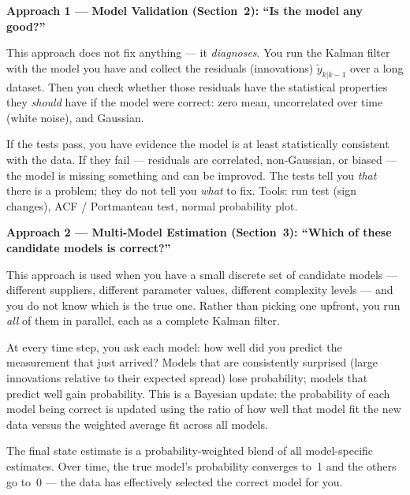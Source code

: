 \documentclass[12pt, a4paper]{article}
\begin{document}
\begin{keybox}
  \textbf{Approach 1 --- Model Validation (Section~2):
  ``Is the model any good?''}

  This approach does not fix anything --- it \emph{diagnoses}.
  You run the Kalman filter with the model you have and collect the
  residuals (innovations) $\tilde{y}_{k|k-1}$ over a long dataset.
  Then you check whether those residuals have the statistical properties
  they \emph{should} have if the model were correct: zero mean,
  uncorrelated over time (white noise), and Gaussian.

  If the tests pass, you have evidence the model is at least
  statistically consistent with the data.
  If they fail --- residuals are correlated, non-Gaussian, or biased ---
  the model is missing something and can be improved.
  The tests tell you \emph{that} there is a problem; they do not tell
  you \emph{what} to fix.
  Tools: run test (sign changes), ACF / Portmanteau test, normal
  probability plot.
\end{keybox}

\vspace{6pt}

\begin{keybox}
  \textbf{Approach 2 --- Multi-Model Estimation (Section~3):
  ``Which of these candidate models is correct?''}

  This approach is used when you have a small discrete set of candidate
  models --- different suppliers, different parameter values, different
  complexity levels --- and you do not know which is the true one.
  Rather than picking one upfront, you run \emph{all} of them in
  parallel, each as a complete Kalman filter.

  At every time step, you ask each model: how well did you predict the
  measurement that just arrived?
  Models that are consistently surprised (large innovations relative to
  their expected spread) lose probability; models that predict well
  gain probability.
  This is a Bayesian update: the probability of each model being correct
  is updated using the ratio of how well that model fit the new data
  versus the weighted average fit across all models.

  The final state estimate is a probability-weighted blend of all
  model-specific estimates.
  Over time, the true model's probability converges to~1 and the others
  go to~0 --- the data has effectively selected the correct model for
  you.
\end{keybox}
\end{document}
